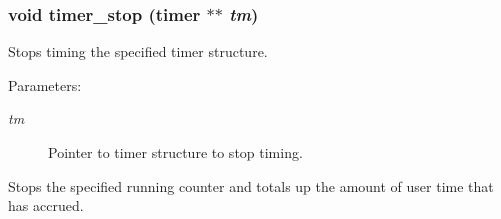 \subsubsection{\setlength{\rightskip}{0pt plus 5cm}void timer\_\-stop ({\bf timer} $\ast$$\ast$ {\em tm})}\label{util_8h_a20}


Stops timing the specified timer structure. 

\begin{Desc}
\item[Parameters:]
\begin{description}
\item[{\em tm}]Pointer to timer structure to stop timing.\end{description}
\end{Desc}
Stops the specified running counter and totals up the amount of user time that has accrued. 